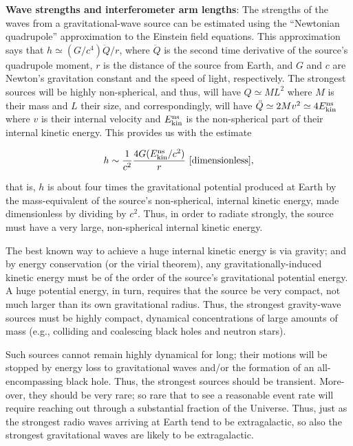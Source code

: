 \documentclass[a4paper,10pt]{article}
\begin{document}
{\noindent}\textbf{Wave strengths and interferometer arm lengths}: The strengths of the waves from a gravitational-wave source can be estimated using the ``Newtonian quadrupole'' approximation to the Einstein field equations. This approximation says that $h\simeq(G/c^4)\ddot{Q}/r$, where $\ddot{Q}$ is the second time derivative of the source's quadrupole moment, $r$ is the distance of the source from Earth, and $G$ and $c$ are Newton's gravitation constant and the speed of light, respectively. The strongest sources will be highly non-spherical, and thus, will have $Q\simeq ML^2$ where $M$ is their mass and $L$ their size, and correspondingly, will have $\ddot{Q}\simeq2Mv^2\simeq4E_{\rm kin}^{\rm ns}$ where $v$ is their internal velocity and $E_{\rm kin}^{\rm ns}$ is the non-spherical part of their internal
kinetic energy. This provides us with the estimate

\begin{align*}
    h \sim \frac{1}{c^2} \frac{4G(E_{\rm kin}^{\rm ns}/c^2)}{r}  ~ [{\rm dimensionless}],
\end{align*}

{\noindent}that is, $h$ is about four times the gravitational potential produced at Earth by the mass-equivalent of the source's non-spherical, internal kinetic energy, made dimensionless by dividing by $c^2$. Thus, in order to radiate strongly, the source must have a very large, non-spherical internal kinetic energy.

{\noindent}The best known way to achieve a huge internal kinetic energy is via gravity; and by energy conservation (or the virial theorem), any gravitationally-induced kinetic energy must be of the order of the source's gravitational potential energy. A huge potential energy, in turn, requires that the source be very compact, not much larger than its own gravitational radius. Thus, the strongest gravity-wave sources must be highly compact, dynamical concentrations of large amounts of mass (e.g., colliding and coalescing black holes and neutron stars).

{\noindent}Such sources cannot remain highly dynamical for long; their motions will be stopped by energy loss to gravitational waves and/or the formation of an all-encompassing black hole. Thus, the strongest sources should be transient. More-over, they should be very rare; so rare that to see a reasonable event rate will require reaching out through a substantial fraction of the Universe. Thus, just as the strongest radio waves arriving at Earth tend to be extragalactic, so also the strongest gravitational waves are likely to be extragalactic.
\end{document}

